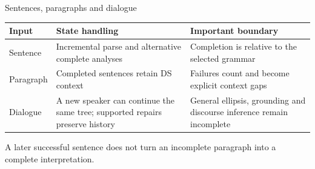 \documentclass[aspectratio=169,11pt]{beamer}
\newcommand{\aside}[1]{\par{\small\color{Muted}#1}\par}
\begin{document}
\begin{frame}{Sentences, paragraphs and dialogue}
  \color{Ink}
  \begin{tabularx}{\textwidth}{@{}p{27mm}YY@{}}\toprule
    \textbf{Input} & \textbf{State handling} & \textbf{Important boundary}\\\midrule
    Sentence & Incremental parse and alternative complete analyses & Completion is relative to the selected grammar\\[6pt]
    Paragraph & Completed sentences retain DS context & Failures count and become explicit context gaps\\[6pt]
    Dialogue & A new speaker can continue the same tree; supported repairs preserve history & General ellipsis, grounding and discourse inference remain incomplete\\\bottomrule
  \end{tabularx}\par
  \vspace{5mm}
  \aside{A later successful sentence does not turn an incomplete paragraph into a complete interpretation.}
\end{frame}
\end{document}
